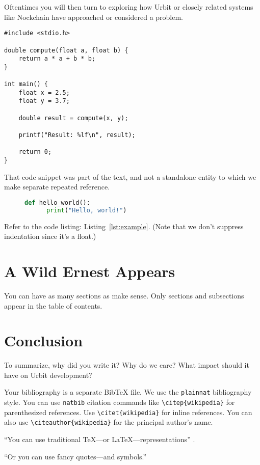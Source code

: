 \documentclass[twoside]{article}
\begin{document}
Oftentimes you will then turn to exploring how Urbit or closely related systems like Nockchain have approached or considered a problem.

\lstset{language=C}
\begin{lstlisting}
#include <stdio.h>

double compute(float a, float b) {
    return a * a + b * b;
}

int main() {
    float x = 2.5;
    float y = 3.7;

    double result = compute(x, y);

    printf("Result: %lf\n", result);

    return 0;
}
\end{lstlisting}

\noindent
That code snippet was part of the text, and not a standalone entity to which we make separate repeated reference.

\begin{figure}
  \begin{lstlisting}[language=Python, caption={Example Python Code}, label={lst:example}]
  def hello_world():
      print("Hello, world!")
  \end{lstlisting}
\end{figure}

Refer to the code listing: Listing~\ref{lst:example}.  (Note that we don't suppress indentation since it's a float.)


\section{A Wild Ernest Appears}

You can have as many sections as make sense.  Only sections and subsections appear in the table of contents.

\section{Conclusion}

To summarize, why did you write it?  Why do we care?  What impact should it have on Urbit development?

Your bibliography is a separate BibTeX file.  We use the \texttt{plainnat} bibliography style.  You can use \texttt{natbib} citation commands like \texttt{\textbackslash citep\{wikipedia\}} for parenthesized references.  Use \texttt{\textbackslash citet\{wikipedia\}} for inline references.  You can also use \texttt{\textbackslash citeauthor\{wikipedia\}} for the principal author's name.

``You can use traditional TeX---or LaTeX---representations'' \citep{Varney1987}.

“Or you can use fancy quotes—and symbols.”



\end{document}
